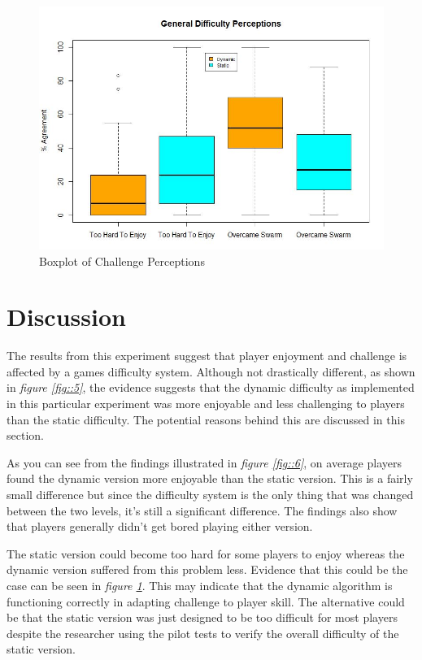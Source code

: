 \documentclass[journal]{IEEEtran}
\begin{document}
\begin{figure}[h]
	\includegraphics[width=1.0\linewidth]{difficultyperceptions.jpg}
	\caption{Boxplot of Challenge Perceptions}
	\label{fig::7}
\end{figure} 

\section{Discussion}
The results from this experiment suggest that player enjoyment and challenge is affected by a games difficulty system. Although not drastically different, as shown in \textit{figure \ref{fig::5}}, the evidence suggests that the dynamic difficulty as implemented in this particular experiment was more enjoyable and less challenging to players than the static difficulty. The potential reasons behind this are discussed in this section.

As you can see from the findings illustrated in \textit{figure \ref{fig::6}}, on average players found the dynamic version more enjoyable than the static version. This is a fairly small difference but since the difficulty system is the only thing that was changed between the two levels, it's still a significant difference. The findings also show that players generally didn't get bored playing either version. 

The static version could become too hard for some players to enjoy whereas the dynamic version suffered from this problem less. Evidence that this could be the case can be seen in \textit{figure \ref{fig::7}}. This may indicate that the dynamic algorithm is functioning correctly in adapting challenge to player skill. The alternative could be that the static version was just designed to be too difficult for most players despite the researcher using the pilot tests to verify the overall difficulty of the static version.
\end{document}

